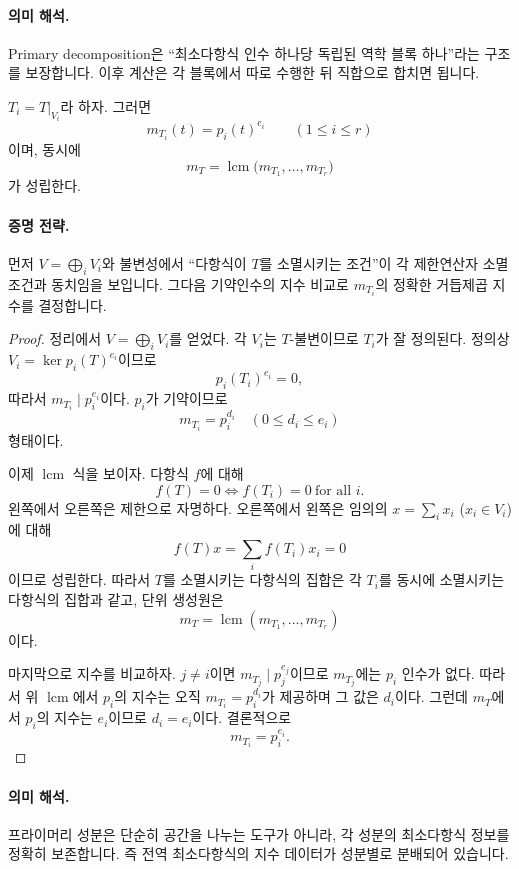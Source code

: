 \paragraph{의미 해석.}
Primary decomposition은 ``최소다항식 인수 하나당 독립된 역학 블록 하나''라는 구조를 보장합니다. 이후 계산은 각 블록에서 따로 수행한 뒤 직합으로 합치면 됩니다.

\begin{theorem}
$T_i=T|_{V_i}$라 하자. 그러면
\[
m_{T_i}(t)=p_i(t)^{e_i}\qquad (1\le i\le r)
\]
이며, 동시에
\[
m_T=\operatorname{lcm}\big(m_{T_1},\dots,m_{T_r}\big)
\]
가 성립한다.
\end{theorem}

\paragraph{증명 전략.}
먼저 $V=\bigoplus_i V_i$와 불변성에서 ``다항식이 $T$를 소멸시키는 조건''이 각 제한연산자 소멸조건과 동치임을 보입니다. 그다음 기약인수의 지수 비교로 $m_{T_i}$의 정확한 거듭제곱 지수를 결정합니다.

\begin{proof}
정리에서 $V=\bigoplus_i V_i$를 얻었다. 각 $V_i$는 $T$-불변이므로 $T_i$가 잘 정의된다. 정의상 $V_i=\ker p_i(T)^{e_i}$이므로
\[
p_i(T_i)^{e_i}=0,
\]
따라서 $m_{T_i}\mid p_i^{e_i}$이다. $p_i$가 기약이므로
\[
m_{T_i}=p_i^{d_i}\quad(0\le d_i\le e_i)
\]
형태이다.

이제 $\operatorname{lcm}$ 식을 보이자. 다항식 $f$에 대해
\[
f(T)=0 \iff f(T_i)=0\ \text{for all }i.
\]
왼쪽에서 오른쪽은 제한으로 자명하다. 오른쪽에서 왼쪽은 임의의 $x=\sum_i x_i$ ($x_i\in V_i$)에 대해
\[
f(T)x=\sum_i f(T_i)x_i=0
\]
이므로 성립한다. 따라서 $T$를 소멸시키는 다항식의 집합은 각 $T_i$를 동시에 소멸시키는 다항식의 집합과 같고, 단위 생성원은
\[
m_T=\operatorname{lcm}(m_{T_1},\dots,m_{T_r})
\]
이다.

마지막으로 지수를 비교하자. $j\ne i$이면 $m_{T_j}\mid p_j^{e_j}$이므로 $m_{T_j}$에는 $p_i$ 인수가 없다. 따라서 위 $\operatorname{lcm}$에서 $p_i$의 지수는 오직 $m_{T_i}=p_i^{d_i}$가 제공하며 그 값은 $d_i$이다. 그런데 $m_T$에서 $p_i$의 지수는 $e_i$이므로 $d_i=e_i$이다. 결론적으로
\[
m_{T_i}=p_i^{e_i}.
\]
\end{proof}

\paragraph{의미 해석.}
프라이머리 성분은 단순히 공간을 나누는 도구가 아니라, 각 성분의 최소다항식 정보를 정확히 보존합니다. 즉 전역 최소다항식의 지수 데이터가 성분별로 분배되어 있습니다.

